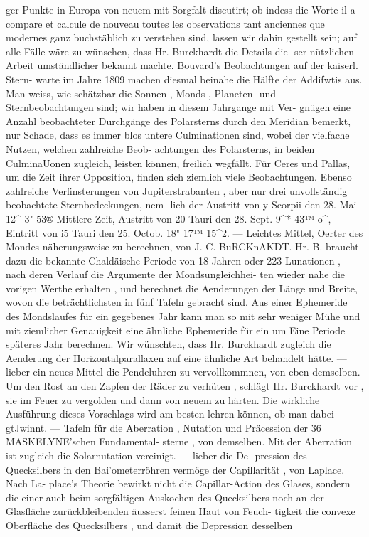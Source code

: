 \documentclass[12pt,a4paper]{article}
\begin{document}
ger  Punkte  in  Europa  von  neuem  mit  Sorgfalt  discutirt;  ob  indess  die  Worte  il  a  compare  et  calcule de  nouveau  toutes  les  observations  tant  anciennes  que  modernes  ganz  buchstäblich  zu  verstehen  sind, lassen  wir  dahin  gestellt  sein;  auf  alle  Fälle  wäre  zu  wünschen,  dass  Hr.  Burckhardt  die  Details  die- ser nützlichen  Arbeit  umständlicher  bekannt  machte.  Bouvard's  Beobachtungen  auf  der  kaiserl.  Stern- warte im  Jahre  1809  machen  diesmal  beinahe  die  Hälfte  der  Addifwtis  aus.  Man  weiss,  wie  schätzbar die  Sonnen-,  Monds-,  Planeten-  und  Sternbeobachtungen  sind;  wir  haben  in  diesem  Jahrgange  mit  Ver- gnügen eine  Anzahl  beobachteter  Durchgänge  des  Polarsterns  durch  den  Meridian  bemerkt,  nur  Schade, dass  es  immer  blos  untere  Culminationen  sind,  wobei  der  vielfache  Nutzen,  welchen  zahlreiche  Beob- achtungen des  Polarsterns,  in  beiden  CulminaUonen  zugleich,  leisten  können,  freilich  wegfällt.  Für  Ceres und  Pallas,  um  die  Zeit  ihrer  Opposition,  finden  sich  ziemlich  viele  Beobachtungen.  Ebenso  zahlreiche Verfinsterungen  von  Jupiterstrabanten ,  aber  nur  drei  unvollständig  beobachtete  Sternbedeckungen,  nem- lich  der  Austritt  von  y  Scorpii  den  28.  Mai  12\textasciicircum{}  3"  53®  Mittlere  Zeit,  Austritt  von  20  Tauri  den  28.  Sept. 9\textasciicircum{}*  43™  o\textasciicircum{},  Eintritt  von  i5  Tauri  den  25.  Octob.  18"  17™  15\textasciicircum{}2.  ---  Leichtes  Mittel,  Oerter  des  Mondes näherungsweise  zu  berechnen,  von  J.  C.  BuRCKnAKDT.  Hr.  B.  braucht  dazu  die  bekannte  Chaldäische Periode  von  18  Jahren  oder  223  Lunationen ,  nach  deren  Verlauf  die  Argumente  der  Mondsungleichhei- ten wieder  nahe  die  vorigen  Werthe  erhalten ,  und  berechnet  die  Aenderungen  der  Länge  und  Breite, wovon  die  beträchtlichsten  in  fünf  Tafeln  gebracht  sind.  Aus  einer  Ephemeride  des  Mondslaufes  für ein  gegebenes  Jahr  kann  man  so  mit  sehr  weniger  Mühe  und  mit  ziemlicher  Genauigkeit  eine  ähnliche Ephemeride  für  ein  um  Eine  Periode  späteres  Jahr  berechnen.  Wir  wünschten,  dass  Hr.  Burckhardt zugleich  die  Aenderung  der  Horizontalparallaxen  auf  eine  ähnliche  Art  behandelt  hätte.  ---  lieber  ein neues  Mittel  die  Pendeluhren  zu  vervollkommnen,  von  eben  demselben.  Um  den  Rost  an  den  Zapfen der  Räder  zu  verhüten ,  schlägt  Hr.  Burckhardt  vor ,  sie  im  Feuer  zu  vergolden  und  dann  von  neuem zu  härten.  Die  wirkliche  Ausführung  dieses  Vorschlags  wird  am  besten  lehren  können,  ob  man  dabei gtJwinnt.  ---  Tafeln  für  die  Aberration ,  Nutation  und  Präcession  der  36  MASKELYNE'schen  Fundamental- sterne ,  von  demselben.  Mit  der  Aberration  ist  zugleich  die  Solarnutation  vereinigt.  ---  lieber  die  De- pression des  Quecksilbers  in  den  Bai'ometerröhren  vermöge  der  Capillarität ,  von  Laplace.  Nach  La- place's  Theorie  bewirkt  nicht  die  Capillar-Action  des  Glases,  sondern  die  einer  auch  beim  sorgfältigen Auskochen  des  Quecksilbers  noch  an  der  Glasfläche  zurückbleibenden  äusserst  feinen  Haut  von  Feuch- tigkeit die  convexe  Oberfläche  des  Quecksilbers ,  und  damit  die  Depression  desselben  
\end{document}
